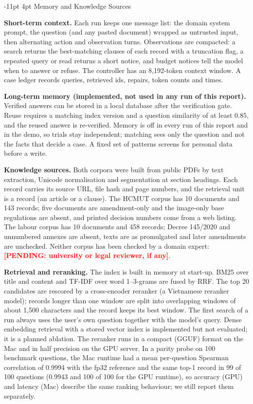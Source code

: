 \documentclass[a4paper,11pt]{article}
\makeatletter
\renewcommand\section{\@startsection{section}{1}{\z@}%
                                   {-11pt \@plus -2pt \@minus -1pt}%
                                   {4pt \@plus 1pt \@minus 1pt}%
                                   {\normalfont\large\bfseries}}
\newcommand{\hdr}[1]{\par\vspace{1.5pt}\noindent\textbf{#1}}
\newcommand{\pending}[1]{\textcolor{red}{\textbf{[PENDING: #1]}}}
\makeatother
\begin{document}
\section{Memory and Knowledge Sources}\label{sec:memory}
\hdr{Short-term context.} Each run keeps one message list: the domain system prompt, the question (and any pasted document) wrapped as untrusted input, then alternating action and observation turns. Observations are compacted: a search returns the best-matching clauses of each record with a truncation flag, a repeated query or read returns a short notice, and budget notices tell the model when to answer or refuse. The controller has an 8,192-token context window. A case ledger records queries, retrieved ids, repairs, token counts and times.

\hdr{Long-term memory (implemented, not used in any run of this report).} Verified answers can be stored in a local database after the verification gate. Reuse requires a matching index version and a question similarity of at least 0.85, and the reused answer is re-verified. Memory is off in every run of this report and in the demo, so trials stay independent; matching sees only the question and not the facts that decide a case. A fixed set of patterns screens for personal data before a write.

\hdr{Knowledge sources.} Both corpora were built from public PDFs by text extraction, Unicode normalisation and segmentation at section headings. Each record carries its source URL, file hash and page numbers, and the retrieval unit is a record (an article or a clause). The HCMUT corpus has 10 documents and 143 records; five documents are amendment-only and the image-only base regulations are absent, and printed decision numbers come from a web listing. The labour corpus has 10 documents and 458 records; Decree 145/2020 and unnumbered annexes are absent, texts are as promulgated and later amendments are unchecked. Neither corpus has been checked by a domain expert: \pending{university or legal reviewer, if any}.

\hdr{Retrieval and reranking.} The index is built in memory at start-up. BM25 over title and content and TF-IDF over word 1--3-grams are fused by RRF. The top 20 candidates are rescored by a cross-encoder reranker (a Vietnamese reranker model); records longer than one window are split into overlapping windows of about 1,500 characters and the record keeps its best window. The first search of a run always uses the user's own question together with the model's query. Dense embedding retrieval with a stored vector index is implemented but not evaluated; it is a planned ablation. The reranker runs in a compact (GGUF) format on the Mac and in half precision on the GPU server. In a parity probe on 100 benchmark questions, the Mac runtime had a mean per-question Spearman correlation of 0.9994 with the fp32 reference and the same top-1 record in 99 of 100 questions (0.9943 and 100 of 100 for the GPU runtime), so accuracy (GPU) and latency (Mac) describe the same ranking behaviour; we still report them separately.
\end{document}
